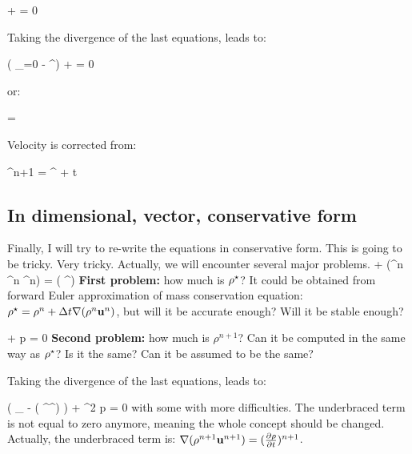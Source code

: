 \documentclass{report}
\begin{document}
\be
  +
  = 
  0
  \; \; \; \; [ \frac{m}{s^2} ]
\ee

Taking the divergence of the last equations, leads to:

\be
  \left(   _{=0}
                      - \nabla \uvw^\s \right)
  +
  = 
  0
  \; \; \; \; [ \frac{1}{s^2} ]
\ee

or:

\be
   = 
  \; \; \; \; [ \frac{1}{s^2} ]
\ee

Velocity is corrected from:

\be
  \uvw^{n+1} 
  =
  \uvw^\s
  +
  {\Delta t} 
  \; \; \; \; [ \frac{m}{s} ]
\ee

\subsection{In dimensional, vector, conservative form}

Finally, I will try to re-write the equations in conservative form.
This is going to be tricky. Very tricky. Actually, we will encounter
several major problems. 
%
\be
  + \nabla (\rho^n \uvw^n \uvw^n)
  =
  \nabla \left( \mu \nabla \uvw^\s \right)
  \; \; \; \; [ \frac{kg}{m^2 s^2} ]
\ee
%
{\bf First problem:} how much is $\rho^\star$? It could be obtained from
forward Euler approximation of mass conservation equation: 
$\rho^\star = \rho^n + \Delta t \nabla (\rho^n {\bf u}^n)$, but will it be
accurate enough? Will it be stable enough?

\be
  +
  \nabla p
  = 
  0
  \; \; \; \; [ \frac{kg}{m^2 s^2} ]
\ee
%
{\bf Second problem:} how much is $\rho^{n+1}$? Can it be computed in the
same way as $\rho^\star$? Is it the same? Can it be assumed to be the same?

Taking the divergence of the last equations, leads to:

\be
  \left(   _{}
                      - \nabla ( \rho^\s    \uvw^\s    ) \right)
  +
  \nabla^2 p
  = 
  0
  \; \; \; \; [ \frac{kg}{m^3 s^2} ]
\ee
%
with some with more difficulties. The underbraced term is not equal
to zero anymore, meaning the whole concept should be changed. Actually,
the underbraced term is: $\nabla(\rho^{n+1} {\bf u}^{n+1}) = ( \frac{\partial \rho}{\partial t} ) ^{n+1}$.
\end{document}
